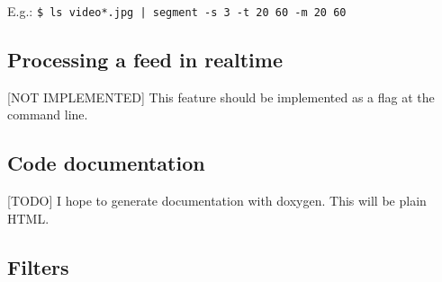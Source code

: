 \documentclass[letter]{article}
\begin{document}
E.g.: \texttt{\$ ls video*.jpg | segment -s 3 -t 20 60 -m 20 60}


\subsection{Processing a feed in realtime}
[NOT IMPLEMENTED] This feature should be implemented as a flag at the command line. 

\subsection{Code documentation}
[TODO] I hope to generate documentation with doxygen. This will be plain HTML. 

\begin{appendices}
\section{Filters}


\end{appendices}
\end{document}

